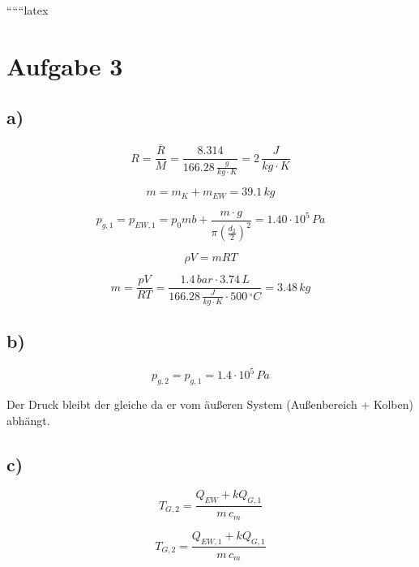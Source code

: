 
``````latex


\section*{Aufgabe 3}

\subsection*{a)}
\begin{equation*}
    R = \frac{\bar{R}}{M} = \frac{8.314}{166.28 \, \frac{g}{kg \cdot K}} = 2 \, \frac{J}{kg \cdot K}
\end{equation*}

\begin{equation*}
    m = m_K + m_{EW} = 39.1 \, kg
\end{equation*}

\begin{equation*}
    p_{g,1} = p_{EW,1} = p_0 m b + \frac{m \cdot g}{\pi \left( \frac{d_2}{2} \right)^2} = 1.40 \cdot 10^5 \, Pa
\end{equation*}

\begin{equation*}
    \rho V = mRT
\end{equation*}

\begin{equation*}
    m = \frac{pV}{RT} = \frac{1.4 \, bar \cdot 3.74 \, L}{166.28 \, \frac{J}{kg \cdot K} \cdot 500 \, ^\circ C} = 3.48 \, kg
\end{equation*}

\subsection*{b)}
\begin{equation*}
    p_{g,2} = p_{g,1} = 1.4 \cdot 10^5 \, Pa
\end{equation*}

Der Druck bleibt der gleiche da er vom äußeren System (Außenbereich + Kolben) abhängt.

\subsection*{c)}
\begin{equation*}
    T_{G,2} = \frac{Q_{EW} + k Q_{G,1}}{m \, c_m}
\end{equation*}

\begin{equation*}
    T_{G,2} = \frac{Q_{EW,1} + k Q_{G,1}}{m \, c_m}
\end{equation*}

